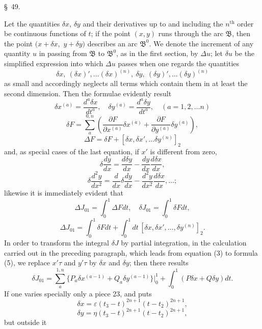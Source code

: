 \documentclass[11pt,a4paper,leqno]{article}
\begin{document}
\begin{center}
{\large \S~49.}
\end{center}

Let the quantities $\delta x$, $\delta y$ and their derivatives up to and including the $n^{\mathrm{th}}$ order be continuous functions of $t$; if the point $(x,y)$ runs through the arc $\mathfrak B$, then the point $(x+\delta x,$
$y+\delta y)$ describes an arc $\mathfrak B^0$. We denote the increment of any quantity $u$ in passing from $\mathfrak B$ to $\mathfrak B^0$, as in the first section, by $\Delta u$; let $\delta u$ be the simplified expression into which $\Delta u$ passes when one regards the quantities
\[
\delta x,\ (\delta x)',\ldots (\delta x)^{(n)},\ \delta y,\ (\delta y)',\ldots (\delta y)^{(n)}
\]
as small and accordingly neglects all terms which contain them in at least the second dimension. Then the formulae evidently result
\[
\delta x^{(a)}=\frac{d^a\delta x}{dt^a},\quad
\delta y^{(a)}=\frac{d^a\delta y}{dt^a},\quad (a=1,2,\ldots n)
\]
\[
\delta F=\sum_a^{0,n}\left(\frac{\partial F}{\partial x^{(a)}}\delta x^{(a)}+\frac{\partial F}{\partial y^{(a)}}\delta y^{(a)}\right),
\]
\[
\Delta F=\delta F+[\delta x,\delta x',\ldots \delta y^{(n)}]_2
\]
and, as special cases of the last equation, if $x'$ is different from zero,
\[
\delta\frac{dy}{dx}=\frac{d\delta y}{dx}-\frac{dy}{dx}\frac{d\delta x}{dx},
\]
\[
\delta\frac{d^2y}{dx^2}=\frac{d}{dx}\delta\frac{dy}{dx}-\frac{d^2y}{dx^2}\frac{d\delta x}{dx},\ldots;
\]
likewise it is immediately evident that
\[
\Delta J_{01}=\int_0^1\Delta Fdt,
\quad
\delta J_{01}=\int_0^1\delta Fdt,
\]
\begin{equation}\tag{9}
\Delta J_{01}=\int_0^1\delta Fdt+\int_0^1dt\,[\delta x,\delta x',\ldots,\delta y^{(n)}]_2.
\end{equation}
In order to transform the integral $\delta J$ by partial integration, in the calculation carried out in the preceding paragraph, which leads from equation (3) to formula (5), we replace $x'\tau$ and $y'\tau$ by $\delta x$ and $\delta y$; then there results
\begin{equation}\tag{10}
\delta J_{01}=\sum_a^{1,n}\{P_a\delta x^{(a-1)}+Q_a\delta y^{(a-1)}\}\bigg|_0^1
+\int_0^1(P\delta x+Q\delta y)dt.
\end{equation}
If one varies specially only a piece 23, and puts
\[
\delta x=\varepsilon(t_3-t)^{2n+1}(t-t_2)^{2n+1},
\]
\[
\delta y=\eta(t_3-t)^{2n+1}(t-t_2)^{2n+1},
\]
but outside it
\end{document}
